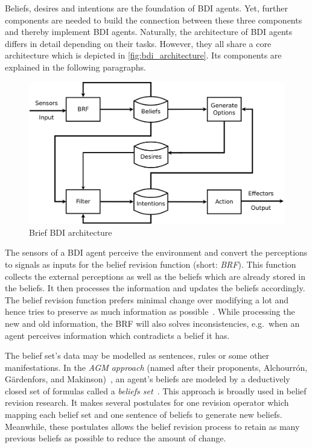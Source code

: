 Beliefs, desires and intentions are the foundation of BDI agents.
Yet, further components are needed to build the connection between these three components and thereby implement BDI agents.
Naturally, the architecture of BDI agents differs in detail depending on their tasks.
However, they all share a core architecture which is depicted in \autoref{fig:bdi_architecture}.
Its components are explained in the following paragraphs.
\begin{figure}[htbp]
  \centering
  \includegraphics[width=\textwidth]{images/BDIAr}
  \caption{Brief BDI architecture~\cite{BDIA}}
  \label{fig:bdi_architecture}
\end{figure}

The sensors of a BDI agent perceive the environment and convert the perceptions to signals as inputs for the belief revision function (short: \emph{BRF}).
This function collects the external perceptions as well as the beliefs which are already stored in the beliefs.
It then processes the information and updates the beliefs accordingly.
The belief revision function prefers minimal change over modifying a lot and hence tries to preserve as much information as possible~\cite{Antje_SpatialBelief_2011}.
While processing the new and old information, the BRF will also solves inconsistencies, e.g.\ when an agent perceives information which contradicts a belief it has.

The belief set's data may be modelled as sentences, rules or some other manifestations.
In the \emph{AGM approach} (named after their proponents, Alchourrón, Gärdenfors, and Makinson)~\cite{alchourron_revision_1985}, an agent's beliefs are modeled by a deductively closed set of formulas called a \emph{beliefs set}~\cite{James_revise_2011}. 
This approach is broadly used in belief revision research.
It makes several postulates for one revision operator which mapping each belief set and one sentence of beliefs to generate new beliefs.
Meanwhile, these postulates allows the belief revision process to retain as many previous beliefs as possible to reduce the amount of change.

